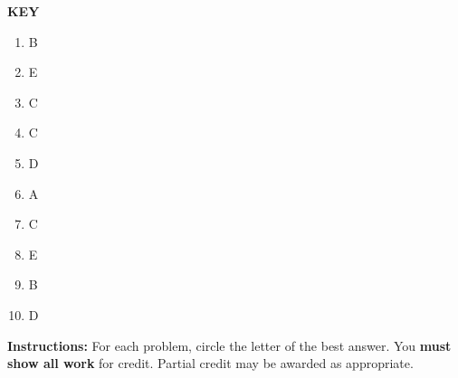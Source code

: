 \documentclass{article}
\begin{document}
\pagestyle{fancy}
\fancyhf{}
\renewcommand{\footrulewidth}{0.4pt}

\clearpage
\textbf{KEY}
\begin{enumerate}
	\item B
	\item E
	\item C
	\item C
	\item D
	\item A
	\item C
	\item E
	\item B
	\item D
\end{enumerate}

\clearpage

\noindent
\textbf{Instructions:} For each problem, circle the letter of the best answer.
You \textbf{must show all work} for credit. Partial credit may be awarded as appropriate.
\end{document}
